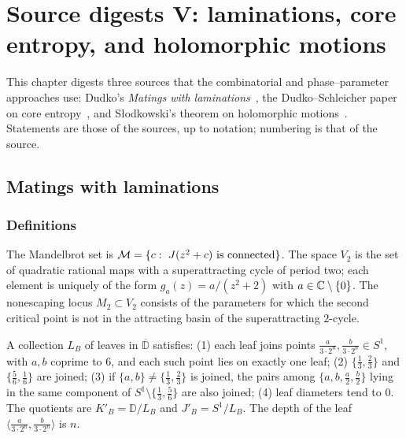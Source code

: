 \chapter[Laminations, entropy, and holomorphic motions]{Source digests V: laminations, core entropy, and holomorphic motions}
\label{ch:digests-laminations-entropy}

This chapter digests three sources that the combinatorial and phase--parameter
approaches use: Dudko's \emph{Matings with laminations}~\cite{DudkoMatings}, the
Dudko--Schleicher paper on core entropy~\cite{DudkoSchleicher}, and Słodkowski's
theorem on holomorphic motions~\cite{Slodkowski}.  Statements are those of the sources,
up to notation; numbering is that of the source.

\section{Matings with laminations}
\label{sec:digest-matings}

\subsection*{Definitions}

\begin{definition}
\label{def:matings-mandelbrot}
The Mandelbrot set is $\mathcal M=\{c:\ J(z^2+c)\text{ is connected}\}$.  The space $V_2$ is the
set of quadratic rational maps with a superattracting cycle of period two; each element
is uniquely of the form $g_a(z)=a/(z^2+2)$ with $a\in\mathbb C\setminus\{0\}$.  The nonescaping
locus $M_2\subset V_2$ consists of the parameters for which the second critical point is not
in the attracting basin of the superattracting $2$-cycle.
\end{definition}

\begin{definition}
\label{def:basilica-lamination}
A collection $L_B$ of leaves in $\overline{\mathbb D}$ satisfies:
(1) each leaf joins points $\frac{a}{3\cdot2^n},\frac{b}{3\cdot2^n}\in S^1$, with $a,b$ coprime to $6$,
and each such point lies on exactly one leaf; (2) $\{\tfrac13,\tfrac23\}$ and $\{\tfrac56,\tfrac16\}$
are joined; (3) if $\{a,b\}\neq\{\tfrac13,\tfrac23\}$ is joined, the pairs among $\{a,b,\tfrac a2,\tfrac b2\}$
lying in the same component of $S^1\setminus\{\tfrac13,\tfrac56\}$ are also joined; (4) leaf diameters tend to $0$.
The quotients are $K'_B=\mathbb D/L_B$ and $J'_B=S^1/L_B$.  The depth of the leaf
$\langle\frac{a}{3\cdot2^n},\frac{b}{3\cdot2^n}\rangle$ is $n$.
\end{definition}


